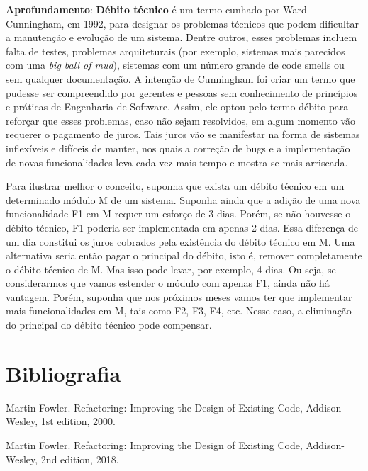 \documentclass[
  11pt,
  twoside]{book}
\newenvironment{esmbox}{\centering \vspace{1.5ex} \begin{tcolorbox}[breakable, colback=backcolor, width=4.9in]}{\end{tcolorbox} \vspace{1.5ex}}
\begin{document}
\begin{esmbox}

\textbf{Aprofundamento}: \textbf{Débito técnico} é um termo cunhado por
Ward Cunningham, em 1992, para designar os problemas técnicos que podem
dificultar a manutenção e evolução de um sistema. Dentre outros, esses
problemas incluem falta de testes, problemas arquiteturais (por exemplo,
sistemas mais parecidos com uma \emph{big ball of mud}), sistemas com um
número grande de code smells ou sem qualquer documentação. A intenção de
Cunningham foi criar um termo que pudesse ser compreendido por gerentes
e pessoas sem conhecimento de princípios e práticas de Engenharia de
Software. Assim, ele optou pelo termo débito para reforçar que esses
problemas, caso não sejam resolvidos, em algum momento vão requerer o
pagamento de juros. Tais juros vão se manifestar na forma de sistemas
inflexíveis e difíceis de manter, nos quais a correção de bugs e a
implementação de novas funcionalidades leva cada vez mais tempo e
mostra-se mais arriscada.

Para ilustrar melhor o conceito, suponha que exista um débito técnico em
um determinado módulo M de um sistema. Suponha ainda que a adição de uma
nova funcionalidade F1 em M requer um esforço de 3 dias. Porém, se não
houvesse o débito técnico, F1 poderia ser implementada em apenas 2 dias.
Essa diferença de um dia constitui os juros cobrados pela existência do
débito técnico em M. Uma alternativa seria então pagar o principal do
débito, isto é, remover completamente o débito técnico de M. Mas isso
pode levar, por exemplo, 4 dias. Ou seja, se considerarmos que vamos
estender o módulo com apenas F1, ainda não há vantagem. Porém, suponha
que nos próximos meses vamos ter que implementar mais funcionalidades em
M, tais como F2, F3, F4, etc. Nesse caso, a eliminação do principal do
débito técnico pode compensar.

\end{esmbox}

\hypertarget{bibliografia-8}{%
\section*{Bibliografia}\label{bibliografia-8}}

Martin Fowler. Refactoring: Improving the Design of Existing Code,
Addison-Wesley, 1st edition, 2000.

Martin Fowler. Refactoring: Improving the Design of Existing Code,
Addison-Wesley, 2nd edition, 2018.
\end{document}
